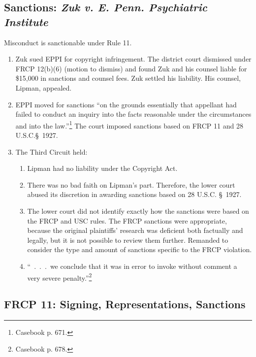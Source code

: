 \subsection{Sanctions: \emph{Zuk v. E. Penn. Psychiatric Institute}}

Misconduct is sanctionable under Rule 11.

\begin{enumerate}
    \item Zuk sued EPPI for copyright infringement. The district court dismissed 
    under FRCP 12(b)(6) (motion to dismiss) and found Zuk and his counsel 
    liable for \$15,000 in sanctions and counsel fees. Zuk settled his 
    liability. His counsel, Lipman, appealed.
    \item EPPI moved for sanctions ``on the grounds essentially that appellant 
    had failed to conduct an inquiry into the facts reasonable under the 
    circumstances and into the law.''\footnote{Casebook p. 671.} The court 
    imposed sanctions based on FRCP 11 and 28 U.S.C.\S\ 1927.
    \item The Third Circuit held:
    \begin{enumerate}
        \item Lipman had no liability under the Copyright Act.
        \item There was no bad faith on Lipman's part. Therefore, the lower 
        court abused its discretion in awarding sanctions based on 28 U.S.C. 
        \S\ 1927.
        \item The lower court did not identify exactly how the sanctions were 
        based on the FRCP and USC rules. The FRCP sanctions were appropriate, 
        because the original plaintiffs' research was deficient both factually 
        and legally, but it is not possible to review them further. Remanded 
        to consider the type and amount of sanctions specific to the FRCP 
        violation.
        \item ``~.~.~.~we conclude that it was in error to invoke without 
        comment a very severe penalty.''\footnote{Casebook p. 678.}
    \end{enumerate}
\end{enumerate}

\subsection{FRCP 11: Signing, Representations, Sanctions}

